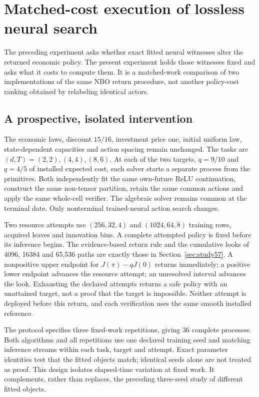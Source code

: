 \section{Matched-cost execution of lossless neural search}\label{sec:study58}
The preceding experiment asks whether exact fitted neural witnesses alter the returned economic policy. The present experiment holds those witnesses fixed and asks what it costs to compute them. It is a matched-work comparison of two implementations of the same NBO return procedure, not another policy-cost ranking obtained by relabeling identical actors.

\subsection{A prospective, isolated intervention}
The economic laws, discount $15/16$, investment price one, initial uniform law, state-dependent capacities and action spacing remain unchanged. The tasks are $(d,T)=(2,2),(4,4),(8,6)$. At each of the two targets, $q=9/10$ and $q=4/5$ of installed expected cost, each solver starts a separate process from the primitives. Both independently fit the same own-future ReLU continuation, construct the same non-tensor partition, retain the same common actions and apply the same whole-cell verifier. The algebraic solver remains common at the terminal date. Only nonterminal trained-neural action search changes.

Two resource attempts use $(256,32,4)$ and $(1024,64,8)$ training rows, acquired leaves and innovation bins. A complete attempted policy is fixed before its inference begins. The evidence-based return rule and the cumulative looks of 4096, 16384 and 65,536 paths are exactly those in Section~\ref{sec:study57}. A nonpositive upper endpoint for $J(\pi)-qJ(0)$ returns immediately; a positive lower endpoint advances the resource attempt; an unresolved interval advances the look. Exhausting the declared attempts returns a safe policy with an unattained target, not a proof that the target is impossible. Neither attempt is deployed before this return, and each verification uses the same smooth installed reference.

The protocol specifies three fixed-work repetitions, giving 36 complete processes. Both algorithms and all repetitions use one declared training seed and matching inference streams within each task, target and attempt. Exact parameter identities test that the fitted objects match; identical seeds alone are not treated as proof. This design isolates elapsed-time variation at fixed work. It complements, rather than replaces, the preceding three-seed study of different fitted objects.

